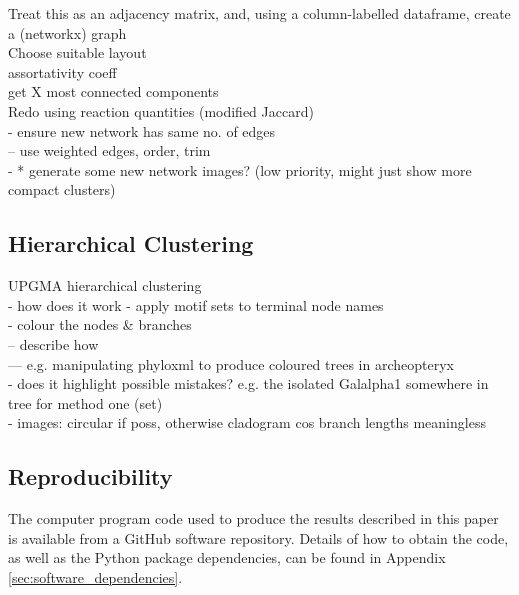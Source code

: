 \documentclass[12pt,a4paper]{article}
\begin{document}
Treat this as an adjacency matrix, and, using a column-labelled dataframe, create a (networkx) graph\\

Choose suitable layout\\

assortativity coeff\\

get X most connected components \\

Redo using reaction quantities (modified Jaccard)\\
- ensure new network has same no. of edges\\
-- use weighted edges, order, trim\\
- * generate some new network images? (low priority, might just show more compact clusters) \\

\subsection{Hierarchical Clustering}
\label{sec:clustering}

UPGMA hierarchical clustering\\
- how does it work
- apply motif sets to terminal node names\\
- colour the nodes \& branches\\
-- describe how\\
--- e.g. manipulating phyloxml to produce coloured trees in archeopteryx\\
- does it highlight possible mistakes? e.g. the isolated Galalpha1 somewhere in tree for method one (set)\\
- images: circular if poss, otherwise cladogram cos branch lengths meaningless\\


\subsection{Reproducibility}
\label{sec:reproducibility}
The computer program code used to produce the results described in this paper is available from a GitHub software repository. Details of how to obtain the code, as well as the Python package dependencies, can be found in Appendix \ref{sec:software_dependencies}.


\end{document}
